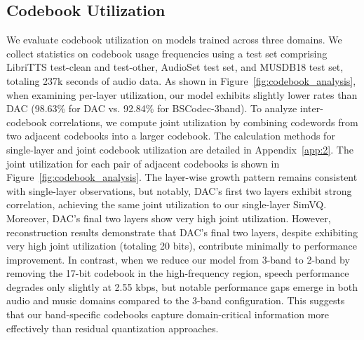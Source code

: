 \documentclass[11pt]{article}
\begin{document}

\subsection{Codebook Utilization}

We evaluate codebook utilization on models trained across three domains. We collect statistics on codebook usage frequencies using a test set comprising LibriTTS test-clean and test-other, AudioSet test set, and MUSDB18 test set, totaling 237k seconds of audio data. As shown in Figure~\ref{fig:codebook_analysis}, when examining per-layer utilization, our model exhibits slightly lower rates than DAC (98.63\% for DAC vs. 92.84\% for BSCodec-3band). To analyze inter-codebook correlations, we compute joint utilization by combining codewords from two adjacent codebooks into a larger codebook. The calculation methods for single-layer and joint codebook utilization are detailed in Appendix~\ref{app:2}. The joint utilization for each pair of adjacent codebooks is shown in Figure~\ref{fig:codebook_analysis}. The layer-wise growth pattern remains consistent with single-layer observations, but notably, DAC's first two layers exhibit strong correlation, achieving the same joint utilization to our single-layer SimVQ. Moreover, DAC's final two layers show very high joint utilization. However, reconstruction results demonstrate that DAC's final two layers, despite exhibiting very high joint utilization (totaling 20 bits), contribute minimally to performance improvement. In contrast, when we reduce our model from 3-band to 2-band by removing the 17-bit codebook in the high-frequency region, speech performance degrades only slightly at 2.55 kbps, but notable performance gaps emerge in both audio and music domains compared to the 3-band configuration. This suggests that our band-specific codebooks capture domain-critical information more effectively than residual quantization approaches.
\end{document}
